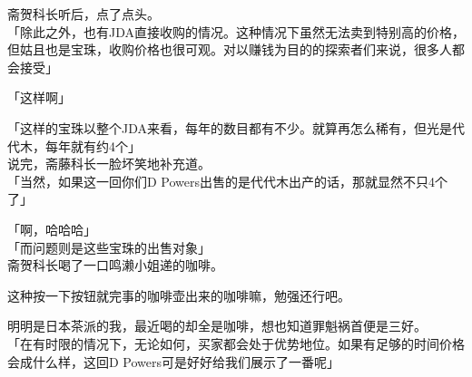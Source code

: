 斋贺科长听后，点了点头。\\

「除此之外，也有JDA直接收购的情况。这种情况下虽然无法卖到特别高的价格，但姑且也是宝珠，收购价格也很可观。对以赚钱为目的的探索者们来说，很多人都会接受」

「这样啊」

「这样的宝珠以整个JDA来看，每年的数目都有不少。就算再怎么稀有，但光是代代木，每年就有约4个」\\

说完，斋藤科长一脸坏笑地补充道。\\

「当然，如果这一回你们D Powers出售的是代代木出产的话，那就显然不只4个了」

「啊，哈哈哈」\\

「而问题则是这些宝珠的出售对象」\\

斋贺科长喝了一口鸣濑小姐递的咖啡。

这种按一下按钮就完事的咖啡壶出来的咖啡嘛，勉强还行吧。

明明是日本茶派的我，最近喝的却全是咖啡，想也知道罪魁祸首便是三好。\\

「在有时限的情况下，无论如何，买家都会处于优势地位。如果有足够的时间价格会成什么样，这回D Powers可是好好给我们展示了一番呢」\\

